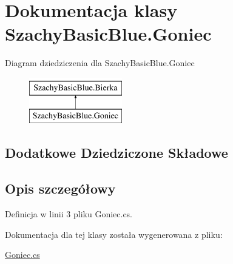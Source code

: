 \hypertarget{class_szachy_basic_blue_1_1_goniec}{\section{Dokumentacja klasy Szachy\-Basic\-Blue.\-Goniec}
\label{class_szachy_basic_blue_1_1_goniec}
}
Diagram dziedziczenia dla Szachy\-Basic\-Blue.\-Goniec\begin{figure}[H]
\begin{center}
\leavevmode
\includegraphics[height=2.000000cm]{class_szachy_basic_blue_1_1_goniec}
\end{center}
\end{figure}
\subsection*{Dodatkowe Dziedziczone Składowe}


\subsection{Opis szczegółowy}


Definicja w linii 3 pliku Goniec.\-cs.



Dokumentacja dla tej klasy została wygenerowana z pliku\-:\begin{DoxyCompactItemize}
\item 
\hyperlink{_goniec_8cs}{Goniec.\-cs}\end{DoxyCompactItemize}
